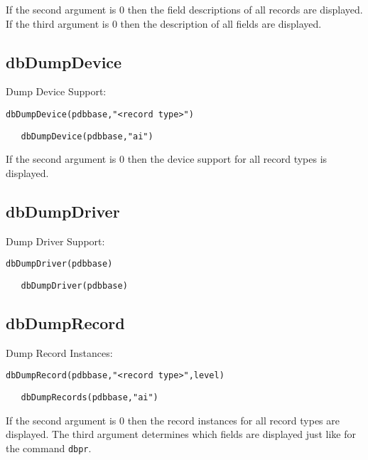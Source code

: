 If the second argument is 0 then the field descriptions of all records are displayed. If the third argument is 0 then the 
description of all fields are displayed.

\subsection{dbDumpDevice}

Dump Device Support:

\begin{verbatim}
dbDumpDevice(pdbbase,"<record type>")
\end{verbatim}

\begin{verbatim}
   dbDumpDevice(pdbbase,"ai")
\end{verbatim}

If the second argument is 0 then the device support for all record types is displayed.

\subsection{dbDumpDriver}

Dump Driver Support:

\begin{verbatim}
dbDumpDriver(pdbbase)
\end{verbatim}

\begin{verbatim}
   dbDumpDriver(pdbbase)
\end{verbatim}

\subsection{dbDumpRecord}

Dump Record Instances:

\begin{verbatim}
dbDumpRecord(pdbbase,"<record type>",level)
\end{verbatim}

\begin{verbatim}
   dbDumpRecords(pdbbase,"ai")
\end{verbatim}

If the second argument is 0 then the record instances for all record types are displayed. The third argument determines 
which fields are displayed just like for the command \verb|dbpr|.

